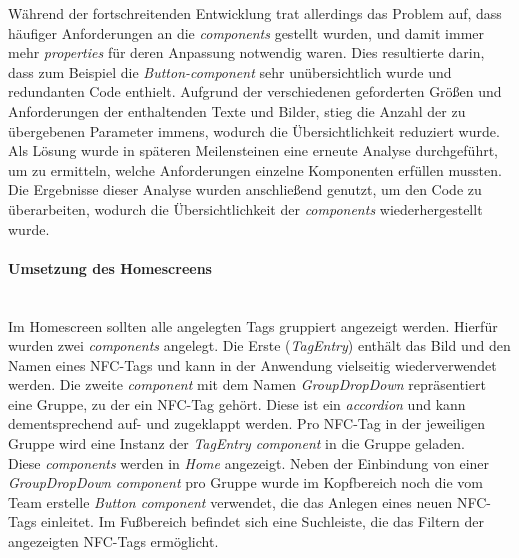 \documentclass[10pt, a4paper]{article}
\begin{document}
\begin{onehalfspace}
Während der fortschreitenden Entwicklung trat allerdings das Problem auf, dass häufiger Anforderungen an die \textit{components} gestellt wurden,
 und damit immer mehr \textit{properties} für deren Anpassung notwendig waren.
Dies resultierte darin, dass zum Beispiel die \textit{Button-component} sehr unübersichtlich wurde und redundanten Code enthielt.
Aufgrund der verschiedenen geforderten Größen und Anforderungen der enthaltenden Texte und Bilder,
 stieg die Anzahl der zu übergebenen Parameter immens, wodurch die Übersichtlichkeit reduziert wurde.
Als Lösung wurde in späteren Meilensteinen eine erneute Analyse durchgeführt, um zu ermitteln, welche Anforderungen einzelne Komponenten erfüllen mussten.
Die Ergebnisse dieser Analyse wurden anschließend genutzt, um den Code zu überarbeiten, wodurch die Übersichtlichkeit der \textit{components} wiederhergestellt wurde.

\paragraph*{Umsetzung des Homescreens}$~$ \\
Im Homescreen sollten alle angelegten Tags gruppiert angezeigt werden. Hierfür wurden zwei \textit{components} angelegt. Die Erste (\textit{TagEntry})
enthält das Bild und den Namen eines NFC-Tags und kann in der Anwendung vielseitig wiederverwendet werden. Die zweite \textit{component} mit dem Namen
\textit{GroupDropDown} repräsentiert eine Gruppe, zu der ein NFC-Tag gehört. Diese ist ein \textit{accordion} und kann dementsprechend auf- und zugeklappt werden.
Pro NFC-Tag in der jeweiligen Gruppe wird eine Instanz der \textit{TagEntry component} in die Gruppe geladen.
\\
Diese \textit{components} werden in \textit{Home} angezeigt. Neben der Einbindung von einer \textit{GroupDropDown component} pro Gruppe
wurde im Kopfbereich noch die vom Team erstelle \textit{Button component} verwendet, die das Anlegen eines neuen NFC-Tags einleitet.
Im Fußbereich befindet sich eine Suchleiste, die das Filtern der angezeigten NFC-Tags ermöglicht.


\end{onehalfspace}
\end{document}
